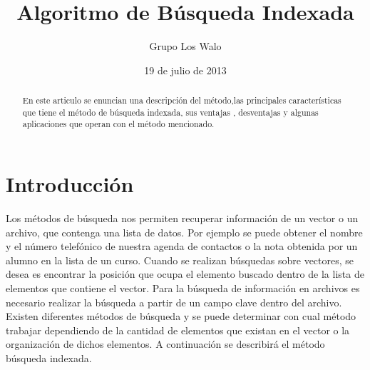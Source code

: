 \documentclass[11pt,a4paper]{article}
\author{Grupo Los Walo}
\title{Algoritmo de Búsqueda Indexada}
\date{19 de julio de 2013}
\begin{document}
\maketitle

\begin{abstract}
En este articulo se enuncian una descripción del método,las principales características que tiene el método de búsqueda indexada, sus ventajas , desventajas y algunas aplicaciones que operan con el método mencionado.
\end{abstract}

\section{Introducción}
Los métodos de búsqueda nos permiten recuperar información de un vector o un archivo,
que contenga una lista de datos. Por ejemplo se puede obtener el nombre y el número
telefónico de nuestra agenda de contactos o la nota obtenida por un alumno en la lista de
un curso.
Cuando se realizan búsquedas sobre vectores, se desea es encontrar la posición que
ocupa el elemento buscado dentro de la lista de elementos que contiene el vector. Para la
búsqueda de información en archivos es necesario realizar la búsqueda a partir de un
campo clave dentro del archivo.
Existen diferentes métodos de búsqueda y se puede determinar con cual método trabajar
dependiendo de la cantidad de elementos que existan en el vector o la organización de
dichos elementos.
A continuación se describirá el método búsqueda indexada.
\end{document}
